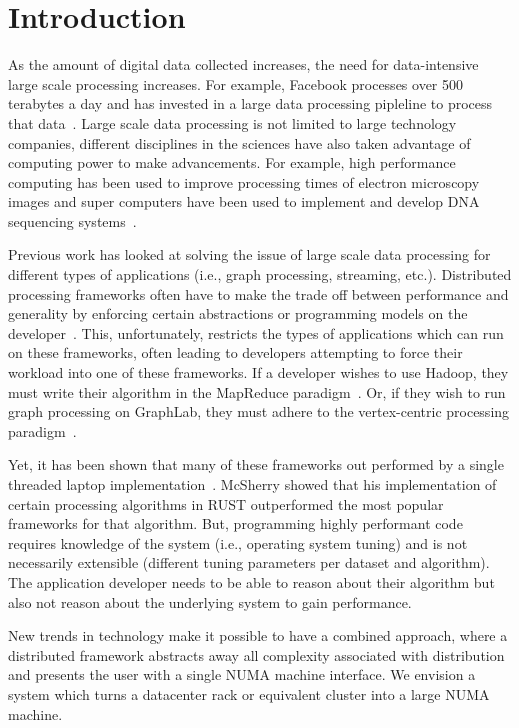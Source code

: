 \section{Introduction} 
\label{sec:intro}
As the amount of digital data collected increases, the need for data-intensive
large scale processing increases. For example, Facebook processes over 500
terabytes a day and has invested in a large data processing pipleline to process
that data~\cite{Chen2016}. Large scale data processing is not limited to large
technology companies, different disciplines in the sciences have also taken
advantage of computing power to make advancements. For example, high performance
computing has been used to improve processing times of electron microscopy
images and super computers have been used to implement and develop DNA
sequencing systems~\cite{Puckelwartz2017,Oelerich2017}.

Previous work has looked at solving the issue of large scale data processing for
different types of applications (i.e., graph processing, streaming, etc.).
Distributed processing frameworks often have to make the trade off between
performance and generality by enforcing certain abstractions or programming
models on the developer~\cite{Dean2004,Low2010,Murray2013}. 
This, unfortunately, restricts the types of applications which can run on these
frameworks, often leading to developers attempting to force their workload into
one of these frameworks. If a developer wishes to use Hadoop, they must write
their algorithm in the MapReduce paradigm~\cite{Dean2004}. Or, if they wish to
run graph processing on GraphLab, they must adhere to the vertex-centric
processing paradigm~\cite{Low2010}.

Yet, it has been shown that many of these frameworks out performed by a single
threaded laptop implementation~\cite{189908}. McSherry showed that his
implementation of certain processing algorithms in RUST outperformed the most
popular frameworks for that algorithm. But, programming highly performant code
requires knowledge of the system (i.e., operating system tuning) and is not
necessarily extensible  (different tuning parameters per dataset and algorithm).
The application developer needs to be able to reason about their algorithm but
also not reason about the underlying system to gain performance. 

New trends in technology make it possible to have a combined approach, where a
distributed framework abstracts away all complexity associated with distribution
and presents the user with a single NUMA machine interface. We envision a system
which turns a datacenter rack or equivalent cluster into a large NUMA machine.

